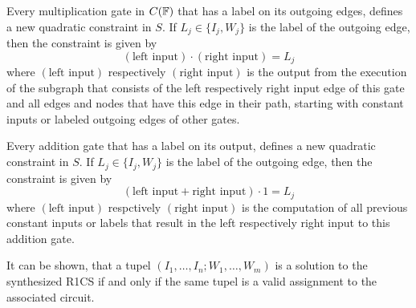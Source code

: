 Every multiplication gate in $C(\mathbb{F})$ that has a label on its outgoing edges, defines a new quadratic constraint in $S$. If $L_j\in\{I_j,W_j\}$ is the label of the outgoing edge, then the constraint is given by
\begin{equation}
(\text{left input})\cdot (\text{right input}) = L_j
\end{equation}  
where $(\text{left input})$ respectively $(\text{right input})$ is the output from the execution of the subgraph that consists of the left respectively right input edge of this gate and all edges and nodes that have this edge in their path, starting with constant inputs or labeled outgoing edges of other gates.

Every addition gate that has a label on its output, defines a new quadratic constraint in $S$. If $L_j\in\{I_j,W_j\}$ is the label of the outgoing edge, then the constraint is given by
\begin{equation}
(\text{left input} + \text{right input})\cdot 1 = L_j
\end{equation}  
where $(\text{left input})$ respctively $(\text{right input})$ is the computation of all previous constant inputs or labels that result in the left respectively right input to this addition gate.  

It can be shown, that a tupel $(I_1,\ldots, I_n;W_1,\ldots,W_m)$ is a solution to the synthesized R1CS if and only if the same tupel is a valid assignment to the associated circuit.

